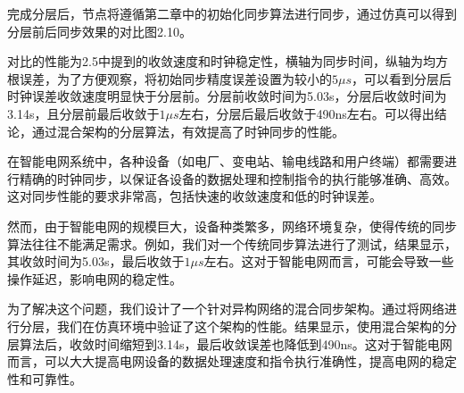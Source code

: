 \documentclass[UTF8,a4paper,12pt]{ctexart}
\numberwithin{equation}{section}
\begin{document}
	完成分层后，节点将遵循第二章中的初始化同步算法进行同步，通过仿真可以得到分层前后同步效果的对比图2.10。
	\begin{figure}[H] 
	\end{figure}
	
	对比的性能为2.5中提到的收敛速度和时钟稳定性，横轴为同步时间，纵轴为均方根误差，为了方便观察，将初始同步精度误差设置为较小的$5\mu s$，可以看到分层后时钟误差收敛速度明显快于分层前。分层前收敛时间为5.03s，分层后收敛时间为3.14s，且分层前最后收敛于$1\mu s$左右，分层后最后收敛于490ns左右。可以得出结论，通过混合架构的分层算法，有效提高了时钟同步的性能。
	
	在智能电网系统中，各种设备（如电厂、变电站、输电线路和用户终端）都需要进行精确的时钟同步，以保证各设备的数据处理和控制指令的执行能够准确、高效。这对同步性能的要求非常高，包括快速的收敛速度和低的时钟误差。
	
	然而，由于智能电网的规模巨大，设备种类繁多，网络环境复杂，使得传统的同步算法往往不能满足需求。例如，我们对一个传统同步算法进行了测试，结果显示，其收敛时间为5.03s，最后收敛于$1\mu s$左右。这对于智能电网而言，可能会导致一些操作延迟，影响电网的稳定性。
	
	为了解决这个问题，我们设计了一个针对异构网络的混合同步架构。通过将网络进行分层，我们在仿真环境中验证了这个架构的性能。结果显示，使用混合架构的分层算法后，收敛时间缩短到3.14s，最后收敛误差也降低到490ns。这对于智能电网而言，可以大大提高电网设备的数据处理速度和指令执行准确性，提高电网的稳定性和可靠性。
	
\end{document}
